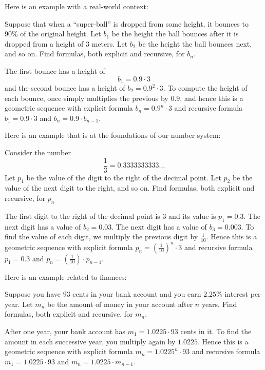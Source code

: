 \documentclass{ximera}
\begin{document}
Here is an example with a real-world context:

\begin{example}
  Suppose that when a ``super-ball'' is dropped from some height, it
  bounces to $90\%$ of the original height. Let $b_1$ be the height
  the ball bounces after it is dropped from a height of $3$
  meters. Let $b_2$ be the height the ball bounces next, and so on.
  Find formulas, both explicit and recursive, for $b_n$.
  \begin{explanation}
    The first bounce has a height of
    \[
    b_1 = 0.9\cdot 3
    \]
    and the second bounce has a height of $b_2 = 0.9^2 \cdot 3$. To
    compute the height of each bounce, once simply multiplies the
    previous by $0.9$, and hence this is a geometric sequence with
    explicit formula $b_n = 0.9^n\cdot 3$ and recursive formula $b_1 =
    0.9\cdot 3$ and $b_n = 0.9\cdot b_{n-1}$.
  \end{explanation}
\end{example}


Here is an example that is at the foundations of our number system:

\begin{example}
  Consider the number
  \[
  \frac{1}{3} = 0.3333333333\dots
  \]
  Let $p_1$ be the value of the digit to the right of the decimal
  point. Let $p_2$ be the value of the next digit to the right, and so
  on. Find formulas, both explicit and recursive, for $p_n$
  \begin{explanation}
    The first digit to the right of the decimal point is $3$ and its
    value is $p_1 = 0.3$. The next digit has a value of $b_2 =
    0.03$. The next digit has a value of $b_3 = 0.003$. To find the
    value of each digit, we multiply the previous digit by
    $\frac{1}{10}$. Hence this is a geometric sequence with explicit
    formula $p_n = \left(\frac{1}{10}\right)^n\cdot 3$ and recursive
    formula $p_1 =0.3$ and $p_n = \left(\frac{1}{10}\right)\cdot
    p_{n-1}$.
  \end{explanation}
\end{example}


Here is an example related to finances:
\begin{example}
  Suppose you have $93$ cents in your bank account and you earn
  $2.25\%$ interest per year. Let $m_n$ be the amount of money in your
  account after $n$ years. Find formulas, both explicit and recursive,
  for $m_n$.
  \begin{explanation}
    After one year, your bank account has $m_1 = 1.0225\cdot 93$ cents
    in it. To find the amount in each successive year, you multiply
    again by $1.0225$. Hence this is a geometric sequence with
    explicit formula $m_n = 1.0225^n\cdot 93$ and recursive formula
    $m_1 =1.0225\cdot 93$ and $m_n = 1.0225\cdot m_{n-1}$.
  \end{explanation}
\end{example}
\end{document}
